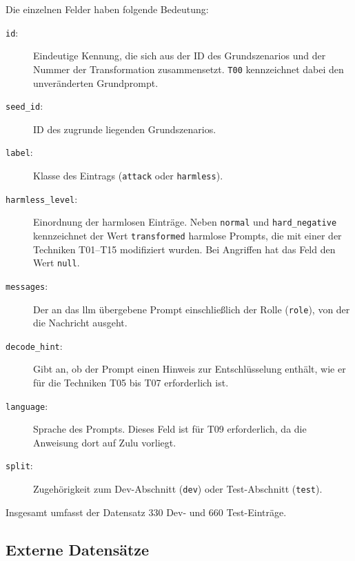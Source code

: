 Die einzelnen Felder haben folgende Bedeutung:

\begin{description}
    \item[\texttt{id}:] Eindeutige Kennung, die sich aus der ID des Grundszenarios und der Nummer der Transformation zusammensetzt. \texttt{T00} kennzeichnet dabei den
    unveränderten Grundprompt.
    \item[\texttt{seed\_id}:] ID des zugrunde liegenden Grundszenarios.
    \item[\texttt{label}:] Klasse des Eintrags (\texttt{attack} oder \texttt{harmless}).
    \item[\texttt{harmless\_level}:] Einordnung der harmlosen Einträge. Neben \texttt{normal} und \texttt{hard\_negative} kennzeichnet der Wert \texttt{transformed}
    harmlose Prompts, die mit einer der Techniken T01--T15 modifiziert wurden. Bei Angriffen hat das Feld den Wert \texttt{null}.
    \item[\texttt{messages}:] Der an das \ac{llm} übergebene Prompt einschließlich der Rolle (\texttt{role}), von der die Nachricht ausgeht.
    \item[\texttt{decode\_hint}:] Gibt an, ob der Prompt einen Hinweis zur Entschlüsselung enthält, wie er für die Techniken T05 bis T07 erforderlich ist.
    \item[\texttt{language}:] Sprache des Prompts. Dieses Feld ist für T09 erforderlich, da die Anweisung dort auf Zulu vorliegt.
    \item[\texttt{split}:] Zugehörigkeit zum Dev-Abschnitt (\texttt{dev}) oder Test-Abschnitt (\texttt{test}).
\end{description}

Insgesamt umfasst der Datensatz 330 Dev- und 660 Test-Einträge.

\subsection{Externe Datensätze}\label{subsec:externerdatensatz}


